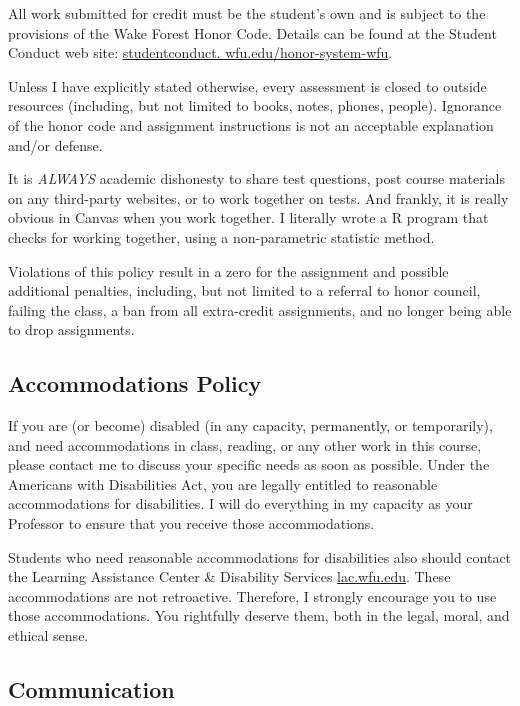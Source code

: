\documentclass[11pt,]{article}
\begin{document}
All work submitted for credit must be the student's own and is subject
to the provisions of the Wake Forest Honor Code. Details can be found at
the Student Conduct web site:
\href{https://studentconduct.wfu.edu/honor-system-wfu/}{studentconduct.
wfu.edu/honor-system-wfu}.

Unless I have explicitly stated otherwise, every assessment is closed to
outside resources (including, but not limited to books, notes, phones,
people). Ignorance of the honor code and assignment instructions is not
an acceptable explanation and/or defense.

It is \emph{ALWAYS} academic dishonesty to share test questions, post
course materials on any third-party websites, or to work together on
tests. And frankly, it is really obvious in Canvas when you work
together. I literally wrote a R program that checks for working
together, using a non-parametric statistic method.

Violations of this policy result in a zero for the assignment and
possible additional penalties, including, but not limited to a referral
to honor council, failing the class, a ban from all extra-credit
assignments, and no longer being able to drop assignments.

\hypertarget{accommodations-policy}{%
\subsection{Accommodations Policy}\label{accommodations-policy}}

If you are (or become) disabled (in any capacity, permanently, or
temporarily), and need accommodations in class, reading, or any other
work in this course, please contact me to discuss your specific needs as
soon as possible. Under the Americans with Disabilities Act, you are
legally entitled to reasonable accommodations for disabilities. I will
do everything in my capacity as your Professor to ensure that you
receive those accommodations.

Students who need reasonable accommodations for disabilities also should
contact the Learning Assistance Center \& Disability Services
\href{https://lac.wfu.edu/}{lac.wfu.edu}. These accommodations are not
retroactive. Therefore, I strongly encourage you to use those
accommodations. You rightfully deserve them, both in the legal, moral,
and ethical sense.

\hypertarget{communication}{%
\subsection{Communication}\label{communication}}
\end{document}
